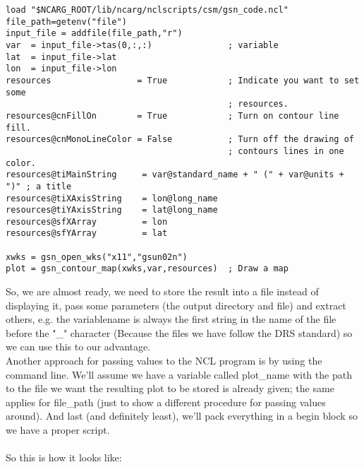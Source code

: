 \documentclass[a4paper,11pt]{ltxdoc}
\begin{document}
\begin{lstlisting}
load "$NCARG_ROOT/lib/ncarg/nclscripts/csm/gsn_code.ncl" 
file_path=getenv("file")
input_file = addfile(file_path,"r")
var  = input_file->tas(0,:,:)               ; variable
lat  = input_file->lat                      
lon  = input_file->lon                      
resources                 = True            ; Indicate you want to set some
                                            ; resources.
resources@cnFillOn        = True            ; Turn on contour line fill.
resources@cnMonoLineColor = False           ; Turn off the drawing of
                                            ; contours lines in one color.
resources@tiMainString     = var@standard_name + " (" + var@units + ")" ; a title
resources@tiXAxisString    = lon@long_name
resources@tiYAxisString    = lat@long_name
resources@sfXArray         = lon
resources@sfYArray         = lat

xwks = gsn_open_wks("x11","gsun02n") 
plot = gsn_contour_map(xwks,var,resources)  ; Draw a map
\end{lstlisting}
So, we are almost ready, we need to store the result into a file instead of displaying it, pass some parameters (the output directory and file) and extract others, e.g. the variablename is always the first string in the name of the file before the "\_" character (Because the files we have follow the DRS standard) so we can use this to our advantage. \\
Another approach for passing values to the NCL program is by using the command line. We'll assume we have a variable called plot\_name with the path to the file we want the resulting plot to be stored is already given; the same applies for file\_path (just to show a different procedure for passing values around). And last (and definitely least), we'll pack everything in a begin block so we have a proper script. \\
\\
So this is how it looks like:
\end{document}

